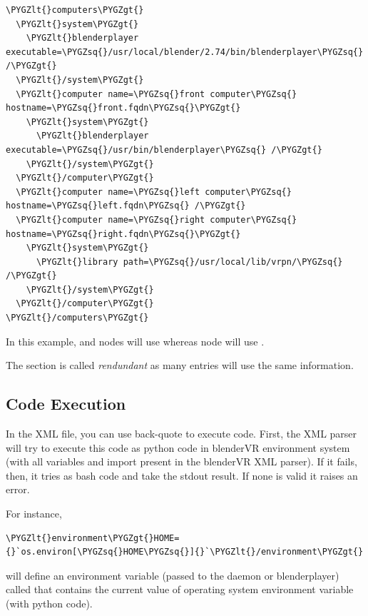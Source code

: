 \documentclass[a4,10pt,openany,oneside]{sphinxmanual}
\def\PYGZlt{\char`\<}
\def\PYGZgt{\char`\>}
\def\PYGZsq{\char`\'}
\begin{document}
\begin{Verbatim}[commandchars=\\\{\}]
\PYGZlt{}computers\PYGZgt{}
  \PYGZlt{}system\PYGZgt{}
    \PYGZlt{}blenderplayer executable=\PYGZsq{}/usr/local/blender/2.74/bin/blenderplayer\PYGZsq{} /\PYGZgt{}
  \PYGZlt{}/system\PYGZgt{}
  \PYGZlt{}computer name=\PYGZsq{}front computer\PYGZsq{} hostname=\PYGZsq{}front.fqdn\PYGZsq{}\PYGZgt{}
    \PYGZlt{}system\PYGZgt{}
      \PYGZlt{}blenderplayer executable=\PYGZsq{}/usr/bin/blenderplayer\PYGZsq{} /\PYGZgt{}
    \PYGZlt{}/system\PYGZgt{}
  \PYGZlt{}/computer\PYGZgt{}
  \PYGZlt{}computer name=\PYGZsq{}left computer\PYGZsq{} hostname=\PYGZsq{}left.fqdn\PYGZsq{} /\PYGZgt{}
  \PYGZlt{}computer name=\PYGZsq{}right computer\PYGZsq{} hostname=\PYGZsq{}right.fqdn\PYGZsq{}\PYGZgt{}
    \PYGZlt{}system\PYGZgt{}
      \PYGZlt{}library path=\PYGZsq{}/usr/local/lib/vrpn/\PYGZsq{} /\PYGZgt{}
    \PYGZlt{}/system\PYGZgt{}
  \PYGZlt{}/computer\PYGZgt{}
\PYGZlt{}/computers\PYGZgt{}
\end{Verbatim}

In this example,  and  nodes will use  whereas  node will use .

The  section is called \emph{rendundant} as many entries will use the same information.


\subsection{Code Execution}
\label{components/configuration-file:code-execution}
In the XML file, you can use back-quote to execute code. First, the XML parser will try to execute this code as python code in blenderVR environment system (with all variables and import present in the blenderVR XML parser). If it fails, then, it tries as bash code and take the stdout result. If none is valid it raises an error.

For instance,

\begin{Verbatim}[commandchars=\\\{\}]
\PYGZlt{}environment\PYGZgt{}HOME={}`os.environ[\PYGZsq{}HOME\PYGZsq{}]{}`\PYGZlt{}/environment\PYGZgt{}
\end{Verbatim}

will define an environment variable (passed to the daemon or blenderplayer) called  that contains the current value of  operating system environment variable (with  python code).
\end{document}

